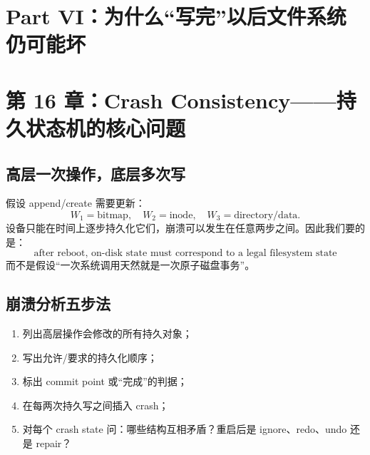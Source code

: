 \documentclass[11pt,a4paper]{ctexart}
\begin{document}
\section{Part VI：为什么“写完”以后文件系统仍可能坏}

\section{第 16 章：Crash Consistency——持久状态机的核心问题}

\subsection{高层一次操作，底层多次写}
假设 append/create 需要更新：
\[
W_1=\text{bitmap},\quad W_2=\text{inode},\quad W_3=\text{directory/data}.
\]
设备只能在时间上逐步持久化它们，崩溃可以发生在任意两步之间。因此我们要的是：
\[
\boxed{\text{after reboot, on-disk state must correspond to a legal filesystem state}}
\]
而不是假设“一次系统调用天然就是一次原子磁盘事务”。

\begin{center}
\end{center}

\subsection{崩溃分析五步法}
\begin{method}
\begin{enumerate}
  \item 列出高层操作会修改的所有持久对象；
  \item 写出允许/要求的持久化顺序；
  \item 标出 commit point 或“完成”的判据；
  \item 在每两次持久写之间插入 crash；
  \item 对每个 crash state 问：哪些结构互相矛盾？重启后是 ignore、redo、undo 还是 repair？
\end{enumerate}
\end{method}
\end{document}
